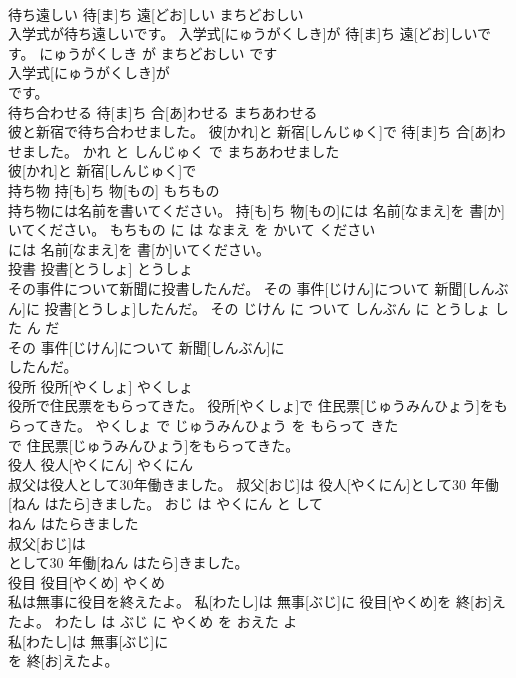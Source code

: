 \documentclass[8pt]{extreport}
\begin{document}
\begin{CJK}{UTF8}{min}
\\	待ち遠しい	待[ま]ち 遠[どお]しい	まちどおしい	
\\	入学式が待ち遠しいです。	入学式[にゅうがくしき]が 待[ま]ち 遠[どお]しいです。	にゅうがくしき が まちどおしい です	
\\	入学式[にゅうがくしき]が
\\	です。			
\\	待ち合わせる	待[ま]ち 合[あ]わせる	まちあわせる	
\\	彼と新宿で待ち合わせました。	彼[かれ]と 新宿[しんじゅく]で 待[ま]ち 合[あ]わせました。	かれ と しんじゅく で まちあわせました	
\\	彼[かれ]と 新宿[しんじゅく]で
\\	持ち物	持[も]ち 物[もの]	もちもの	
\\	持ち物には名前を書いてください。	持[も]ち 物[もの]には 名前[なまえ]を 書[か]いてください。	もちもの に は なまえ を かいて ください	
\\	には 名前[なまえ]を 書[か]いてください。			
\\	投書	投書[とうしょ]	とうしょ	
\\	その事件について新聞に投書したんだ。	その 事件[じけん]について 新聞[しんぶん]に 投書[とうしょ]したんだ。	その じけん に ついて しんぶん に とうしょ した ん だ	
\\	その 事件[じけん]について 新聞[しんぶん]に
\\	したんだ。			
\\	役所	役所[やくしょ]	やくしょ	
\\	役所で住民票をもらってきた。	役所[やくしょ]で 住民票[じゅうみんひょう]をもらってきた。	やくしょ で じゅうみんひょう を もらって きた	
\\	で 住民票[じゅうみんひょう]をもらってきた。			
\\	役人	役人[やくにん]	やくにん	
\\	叔父は役人として30年働きました。	叔父[おじ]は 役人[やくにん]として30 年働[ねん はたら]きました。	おじ は やくにん と して 
\\	ねん はたらきました	
\\	叔父[おじ]は
\\	として30 年働[ねん はたら]きました。			
\\	役目	役目[やくめ]	やくめ	
\\	私は無事に役目を終えたよ。	私[わたし]は 無事[ぶじ]に 役目[やくめ]を 終[お]えたよ。	わたし は ぶじ に やくめ を おえた よ	
\\	私[わたし]は 無事[ぶじ]に
\\	を 終[お]えたよ。			

\end{CJK}
\end{document}
